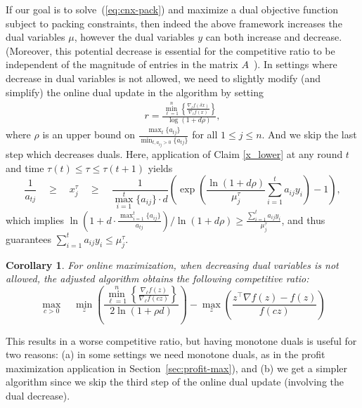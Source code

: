 \documentclass[letterpaper,11pt]{article}
\newtheorem{cor}[thm]{Corollary}
\newcommand{\trans}{\intercal}
\begin{document}
If our goal is to solve~(\ref{eq:cnx-pack}) and maximize a dual
objective function subject to packing constraints, then indeed the above
framework increases the dual variables $\mu$, however the dual variables
$y$ can both increase and decrease. (Moreover, this potential decrease is
essential for the competitive ratio to be independent of the magnitude
of entries in the matrix $A$~\cite{GN12-mor}). In settings where
decrease in dual variables is not allowed, we need to slightly modify
(and simplify) the online dual update in the algorithm by setting
\begin{gather*}
  r = \frac{\min_{\ell=1}^{n}\left\{\frac{\nabla_\ell f(\delta
        x)}{\nabla_\ell f(x)}\right\}}{\log\left(1+ d\rho\right)},
\end{gather*}
where $\rho$ is an upper bound on $\frac{\max_t \{a_{tj}\}}{\min_{t,
    a_{tj}>0}\{a_{tj}\}} $ for all $1\leq j \leq n$.  And we skip the last step which decreases duals.
        Here,
application of Claim \ref{x_lower} at any round $t$ and time $\tau(t)
\leq \tau \leq \tau(t+1)$ yields
\begin{equation}
  \frac{1}{a_{tj}} \quad \geq \quad x^{\tau}_j \quad \geq\quad
  \frac{1}{\max_{i=1}^{t}\{a_{ij}\}\cdot d}
  \left(\exp\left(\frac{\ln\left(1 +
          d\rho\right)}{\mu^{\tau}_j} \sum_{i=1}^{t}a_{ij}y_i\right) -
    1\right),
\end{equation}
which implies $\ln\left(1+d\cdot\frac{\max_{i=1}^{t}\{a_{ij}\}}{a_{tj}}\right) / \ln\left(1+d\rho\right) \geq \frac{\sum_{i=1}^{t}a_{ij}y_i}{\mu^{\tau}_j}$, and thus guarantees $\sum_{i=1}^{t}a_{ij}y_i \leq \mu^{\tau}_j$.

\begin{cor}
For online maximization, when decreasing dual variables is not allowed, the adjusted  algorithm obtains the following competitive ratio:
\begin{equation}
\max_{c>0}\quad \min_{z} \left(\frac{\min_{\ell=1}^{n}\left\{\frac{\nabla_\ell f( z)}{\nabla_\ell f(cz)}\right\}}{2\ln(1+\rho d)}\right) - \max_{z} \left(\frac{ z^\trans \nabla f( z) - f( z)}{f(cz)}\right) \label{eq:mono-cr}
\end{equation}
\end{cor}

This results in a worse competitive ratio, but having monotone duals is
useful for two reasons: (a) in some settings we need monotone duals, as
in the profit maximization application in Section~\ref{sec:profit-max}), and
 (b) we get a simpler algorithm since we skip the third step of the
online dual update (involving the dual decrease).
\end{document}
